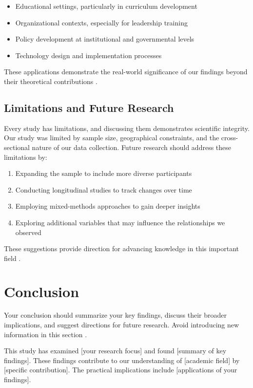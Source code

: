 \documentclass[11pt]{article}
\begin{document}
\begin{itemize}
    \item Educational settings, particularly in curriculum development
    \item Organizational contexts, especially for leadership training
    \item Policy development at institutional and governmental levels
    \item Technology design and implementation processes
\end{itemize}

These applications demonstrate the real-world significance of our findings beyond their theoretical contributions \cite{garcia2020qualitative}.

\subsection{Limitations and Future Research}

Every study has limitations, and discussing them demonstrates scientific integrity. Our study was limited by sample size, geographical constraints, and the cross-sectional nature of our data collection. Future research should address these limitations by:

\begin{enumerate}
    \item Expanding the sample to include more diverse participants
    \item Conducting longitudinal studies to track changes over time
    \item Employing mixed-methods approaches to gain deeper insights
    \item Exploring additional variables that may influence the relationships we observed
\end{enumerate}

These suggestions provide direction for advancing knowledge in this important field \cite{brown2018review}.

\section{Conclusion}
\label{sec:conclusion}

Your conclusion should summarize your key findings, discuss their broader implications, and suggest directions for future research. Avoid introducing new information in this section \cite{smith2020example}.

This study has examined [your research focus] and found [summary of key findings]. These findings contribute to our understanding of [academic field] by [specific contribution]. The practical implications include [applications of your findings].
\end{document}
